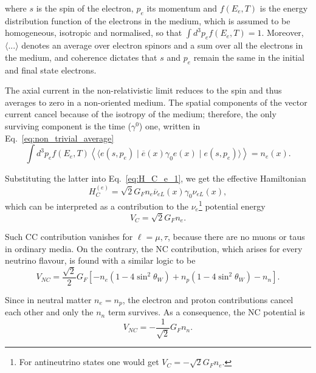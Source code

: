 where $s$ is the spin of the electron, $p_e$ its momentum and $f(E_e, T)$ is the energy distribution function of the electrons in the medium, which is assumed to be homogeneous, isotropic and normalised, so that $\int d^3p_e f(E_e, T) = 1$. Moreover, $\boldsymbol{\Big\langle}... \boldsymbol{\Big\rangle}$ denotes an average over electron spinors and a sum over all the electrons in the medium, and coherence dictates that $s$ and $p_e$ remain the same in the initial and final state electrons.

The axial current in the non-relativistic limit reduces to the spin and thus averages to zero in a non-oriented medium. The spatial components of the vector current cancel because of the isotropy of the medium; therefore, the only surviving component is the time ($\gamma^{0}$) one, written in Eq.~\ref{eq:non_trivial_average}
\begin{equation}
    \label{eq:non_trivial_average}
    \int d^3p_e f(E_e, T) \left\langle \langle e(s, p_e) \mid \overline{e}(x)\gamma_0 e(x) \mid e(s, p_e)\rangle \right\rangle = n_e(x).
\end{equation}

Substituting the latter into Eq.~\ref{eq:H_C_e_1}, we get the effective Hamiltonian
\begin{equation}
    \label{eq:H_C_e_final}
    H_C^{(e)} = \sqrt{2} G_F n_e \overline{\nu}_{eL}(x) \gamma_0 \nu_{eL}(x),
\end{equation}
which can be interpreted as a contribution to the $\nu_e$\footnote{For antineutrino states one would get $V_C = -\sqrt{2} G_F n_e$.} potential energy
\begin{equation}
    \label{eq:V_C_potential}
    V_C = \sqrt{2} G_F n_e.
\end{equation}

Such \ac{CC} contribution vanishes for $\ell = \mu, \tau$, because there are no muons or taus in ordinary media.
On the contrary, the \ac{NC} contribution, which arises for every neutrino flavour, is found with a similar logic to be
\begin{equation}
    \label{eq:V_NC_full}
    V_{NC} = \frac{\sqrt{2}}{2} G_F \left[ -n_e (1 - 4 \sin^2 \theta_W) + n_p (1 - 4 \sin^2 \theta_W) - n_n \right].
\end{equation}

Since in neutral matter $n_e = n_p$, the electron and proton contributions cancel each other and only the $n_n$ term survives.
As a consequence, the \ac{NC} potential is
\begin{equation}
    \label{eq:V_NC_neutron}
    V_{NC} = -\frac{1}{\sqrt{2}} G_F n_n.
\end{equation}

